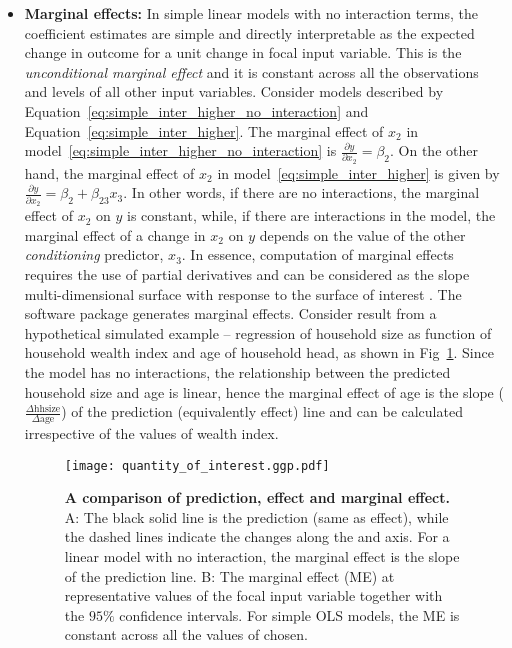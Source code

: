 \begin{itemize}
\item \textbf{Marginal effects:} In simple linear models with no interaction terms, the coefficient estimates are simple and directly interpretable as the expected change in outcome for a unit change in focal input variable. This is the \emph{unconditional marginal effect} and it is constant across all the observations and levels of all other input variables. Consider models described by Equation~\ref{eq:simple_inter_higher_no_interaction} and Equation~\ref{eq:simple_inter_higher}. The marginal effect of $x_2$ in model~\ref{eq:simple_inter_higher_no_interaction} is $\frac{\partial y}{\partial x_2} = \beta_2$. On the other hand, the marginal effect of $x_2$ in model~\ref{eq:simple_inter_higher} is given by $\frac{\partial y}{\partial x_2} = \beta_2 + \beta_{23}x_3$. In other words, if there are no interactions, the marginal effect of $x_2$ on $y$ is constant, while, if there are interactions in the model, the marginal effect of a change in $x_2$ on $y$ depends on the value of the other \emph{conditioning} predictor, $x_3$. In essence, computation of marginal effects requires the use of partial derivatives and can be considered as the slope multi-dimensional surface with response to the surface of interest \cite{leeper2017interpreting}. The  software package  \cite{lenth2018package} generates marginal effects. Consider result from a hypothetical  simulated example -- regression of household size as function of household wealth index and age of household head, as shown in Fig~\ref{fig:qoi_age_pred_plot}. Since the model has no interactions, the relationship between the predicted household size and age is linear, hence the marginal effect of age is the slope ($\frac{\Delta \mathrm{hh size}}{\Delta \mathrm{age}}$) of the prediction (equivalently effect) line and can be calculated irrespective of the values of wealth index.
%
\begin{figure}
\centering
\texttt{[image: quantity\_of\_interest.ggp.pdf]}
\caption{{\bf A comparison of prediction, effect and marginal effect.} A: The black solid line is the prediction (same as effect), while the dashed lines indicate the changes along the  and  axis. For a linear model with no interaction, the marginal effect is the slope of the prediction line. B: The marginal effect (ME) at representative values of the focal input variable  together with the $95\%$ confidence intervals. For simple OLS models, the ME is constant across all the values of  chosen. }
\label{fig:qoi_age_pred_plot}
\end{figure}
%
\end{itemize}

